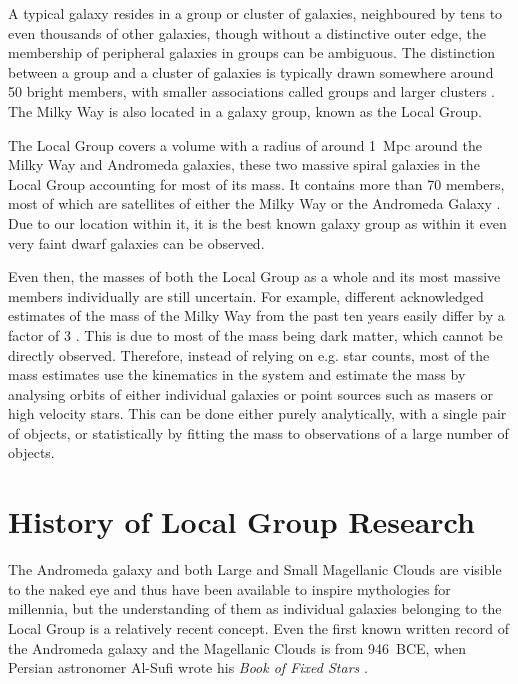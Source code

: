 \documentclass[english, twoside]{HYgradu}
\begin{document}
A typical galaxy resides in a group or cluster of galaxies, neighboured by tens to even thousands of other galaxies, though without a distinctive outer edge, the membership of peripheral galaxies in groups can be ambiguous. The distinction between a group and a cluster of galaxies is typically drawn somewhere around 50 bright members, with smaller associations called groups and larger clusters \citep{mo2010galaxy, binney2008galactic}. The Milky Way is also located in a galaxy group, known as the Local Group.

The Local Group covers a volume with a radius of around 1~Mpc around the Milky Way and Andromeda galaxies, these two massive spiral galaxies in the Local Group accounting for most of its mass. It contains more than 70 members, most of which are satellites of either the Milky Way or the Andromeda Galaxy \citep{mcconnachie2012observed}. Due to our location within it, it is the best known galaxy group as within it even very faint dwarf galaxies can be observed.

Even then, the masses of both the Local Group as a whole and its most massive members individually are still uncertain. For example, different acknowledged estimates of the mass of the Milky Way from the past ten years easily differ by a factor of 3 \citep{wang2015estimating}. This is due to most of the mass being dark matter, which cannot be directly observed. Therefore, instead of relying on e.g. star counts, most of the mass estimates use the kinematics in the system and estimate the mass by analysing orbits of either individual galaxies or point sources such as masers or high velocity stars. This can be done either purely analytically, with a single pair of objects, or statistically by fitting the mass to observations of a large number of objects.


\section{History of Local Group Research}


The Andromeda galaxy and both Large and Small Magellanic Clouds are visible to the naked eye and thus have been available to inspire mythologies for millennia, but the understanding of them as individual galaxies belonging to the Local Group is a relatively recent concept. Even the first known written record of the Andromeda galaxy and the Magellanic Clouds is from 946~BCE, when Persian astronomer Al-Sufi wrote his \textit{Book of Fixed Stars} \citep{schultz2012andromeda, ihsan2011abdul}.
\end{document}
